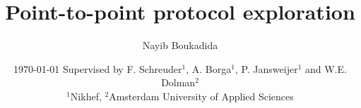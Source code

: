\author{Nayib Boukadida}
\title{Point-to-point protocol exploration}
\date{
	\today \endgraf\bigskip
	\normalsize Supervised by F. Schreuder$^1$, A. Borga$^1$, P. Jansweijer$^1$ and W.E. Dolman$^2$\\
	$^1$Nikhef, $^2$Amsterdam University of Applied Sciences
	}
\def\DocVer{Version 1.5}






\usepackage{tabu}
\usepackage{longtable}



	
	
	
	
	
		
	

	
	
	
	
	
	
	
	
	
	
	
	
	\appendix
	
	
	

